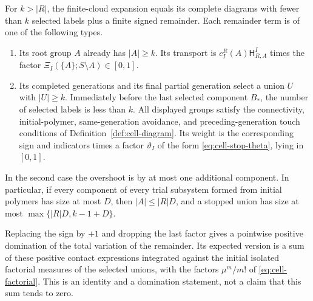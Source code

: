 \begin{proposition}
\label{cell:stopping}
For $k>|R|$, the finite-cloud expansion equals its complete diagrams
with fewer than $k$ selected labels plus a finite signed remainder.
Each remainder term is of one of the following types.
\begin{enumerate}
 \item Its root group $A$ already has $|A|\geq k$.  Its transport is
 $c_I^R(A)\mathsf H^I_{R,A}$ times the factor
 $\Xi_I(\{A\};S\setminus A)\in[0,1]$.
 \item Its completed generations and its final partial generation
 select a union $U$ with $|U|\geq k$.  Immediately before the last
 selected component $B_*$, the number of selected labels is less
 than $k$.  All displayed groups satisfy the connectivity,
 initial-polymer, same-generation avoidance, and preceding-generation
 touch conditions of Definition~\ref{def:cell-diagram}.  Its weight
 is the corresponding sign and indicators times a factor
 $\vartheta_I$ of the form \eqref{eq:cell-stop-theta}, lying in $[0,1]$.
\end{enumerate}
In the second case the overshoot is by at most one additional
component.  In particular, if every component of every trial
subsystem formed from initial polymers has size at most $D$, then
$|A|\leq |R|D$, and a stopped union has size at most
$\max\{|R|D,k-1+D\}$.

Replacing the sign by $+1$ and dropping the last factor gives a
pointwise positive domination of the total variation of the
remainder.  Its expected version is a sum of these positive
contact expressions integrated against the initial isolated
factorial measures of the selected unions, with the factors
$\mu^m/m!$ of \eqref{eq:cell-factorial}.  This is an identity and
a domination statement, not a claim that this sum tends to zero.
\end{proposition}

